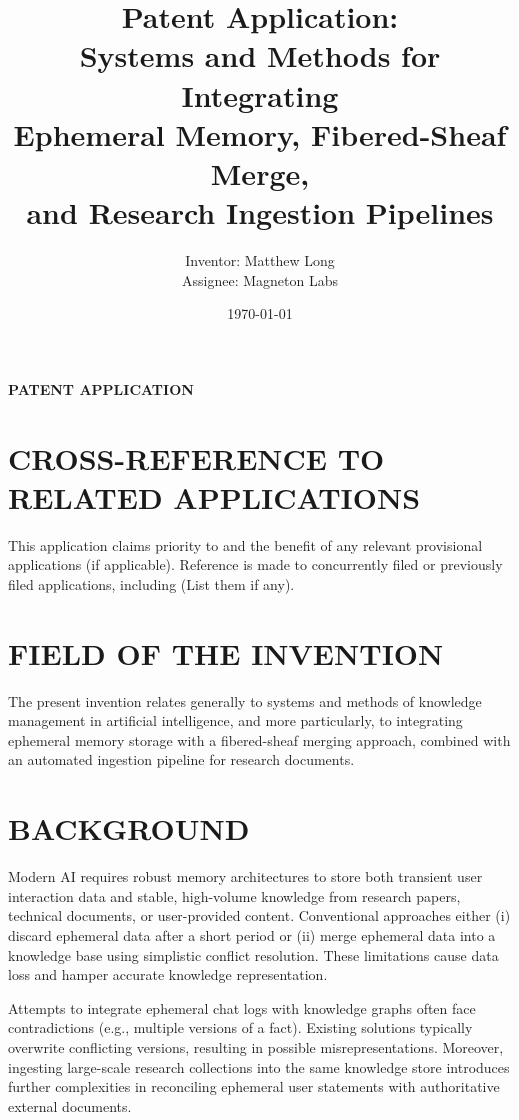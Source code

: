 \documentclass[12pt]{article}
\title{Patent Application: \\
       Systems and Methods for Integrating \\
       Ephemeral Memory, Fibered-Sheaf Merge, \\
       and Research Ingestion Pipelines}
\author{Inventor: Matthew Long \\
        Assignee: Magneton Labs}
\date{\today}
\begin{document}
\maketitle

\begin{center}
{\Large \textbf{PATENT APPLICATION}}
\end{center}

\section*{CROSS-REFERENCE TO RELATED APPLICATIONS}
This application claims priority to and the benefit of any relevant provisional 
applications (if applicable). Reference is made to concurrently filed or 
previously filed applications, including (List them if any).

\section*{FIELD OF THE INVENTION}
The present invention relates generally to systems and methods of knowledge management 
in artificial intelligence, and more particularly, to integrating ephemeral memory 
storage with a fibered-sheaf merging approach, combined with an automated ingestion 
pipeline for research documents.

\section*{BACKGROUND}
Modern AI requires robust memory architectures to store both transient user interaction data 
and stable, high-volume knowledge from research papers, technical documents, or user-provided 
content. Conventional approaches either (i) discard ephemeral data after a short period or 
(ii) merge ephemeral data into a knowledge base using simplistic conflict resolution. These 
limitations cause data loss and hamper accurate knowledge representation.

Attempts to integrate ephemeral chat logs with knowledge graphs often face contradictions 
(e.g., multiple versions of a fact). Existing solutions typically overwrite conflicting versions, 
resulting in possible misrepresentations. Moreover, ingesting large-scale research collections 
into the same knowledge store introduces further complexities in reconciling ephemeral user statements 
with authoritative external documents.
\end{document}
